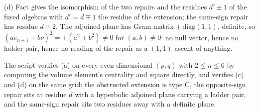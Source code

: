 (d) Fact  gives the isomorphism of the two repairs and the residues $d' \pm 1$ of the fused algebras with $d' = d \mp 1$ the residue of the extension; the same-sign repair has residue $d \mp 2$. The adjoined plane has Gram matrix $\pm\,\mathrm{diag}(1,1)$, definite, so $(a e_{n+1} + b\nu)^2 = \pm(a^2 + b^2) \neq 0$ for $(a,b) \neq 0$: no null vector, hence no ladder pair, hence no reading of the repair as a $(1,1)$ ascent of anything.

The script verifies (a) on every even-dimensional $(p,q)$ with $2 \leq n \leq 6$ by computing the volume element's centrality and square directly, and verifies (c) and (d) on the same grid: the obstructed extension is type C, the opposite-sign repair sits at residue $d$ with a hyperbolic adjoined plane carrying a ladder pair, and the same-sign repair sits two residues away with a definite plane.
